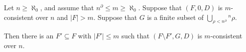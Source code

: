 Let $n \geq \aleph_0$, and assume that $n^{\partial} \leq m \geq \aleph_0$. Suppose that $(F, 0, D)$ is $m$-consistent over $n$ and $|F| > m$. Suppose that $G$ is a finite subset of $\bigcup_{\rho < n^{\partial}} {}^n \rho$.

Then there is an $F' \subseteq F$ with $|F'| \leq m$ such that $(F \setminus F', G, D)$ is $m$-consistent over $n$.
